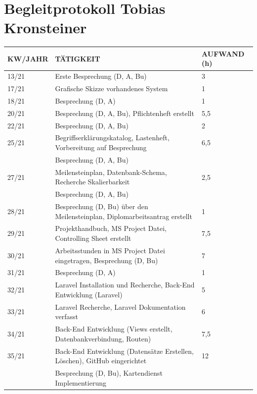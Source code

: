 







\newpage
\section{Begleitprotokoll Tobias Kronsteiner}
\begin{table}[h]
	\begin{tabular}{|l|l|l|}
		\hline
		\textbf{KW/JAHR} &     \textbf{TÄTIGKEIT}  & 	\textbf{AUFWAND (h)}    \\ \hline
		
		13/21   & Erste Besprechung (D, A, Bu) & 3 	\\ \hline
		17/21   & Grafische Skizze vorhandenes System  & 1 	\\ \hline
		18/21   & Besprechung (D, A)  & 1 	\\ \hline
		20/21   & Besprechung (D, A, Bu), Pflichtenheft erstellt & 5,5 	\\ \hline
		22/21   & Besprechung (D, A, Bu) & 2	\\ \hline
		25/21   & Begriffserklärungskatalog, Lastenheft, Vorbereitung auf Besprechung & 6,5   \\
		& Besprechung (D, A, Bu) & \\ \hline	
		27/21   & Meilensteinplan, Datenbank-Schema, Recherche Skalierbarkeit  & 2,5 \\
		& Besprechung (D, A, Bu) & 	\\ \hline		
		28/21   & Besprechung (D, Bu) über den Meilensteinplan, Diplomarbeitsantrag erstellt  & 1 \\ \hline		
		29/21   & Projekthandbuch, MS Project Datei, Controlling Sheet erstellt & 7,5	\\ \hline
		30/21   & Arbeitsstunden in MS Project Datei eingetragen, Besprechung (D, Bu) & 7 	\\ \hline
		31/21   & Besprechung (D, A)  & 1	\\ \hline
		32/21   & Laravel Installation und Recherche, Back-End Entwicklung (Laravel) & 5	\\ \hline
		33/21   & Laravel Recherche, Laravel Dokumentation verfasst & 6	\\ \hline
		34/21   & Back-End Entwicklung (Views erstellt, Datenbankverbindung, Routen) & 7,5	\\ \hline
		35/21   & Back-End Entwicklung (Datensätze Erstellen, Löschen), GitHub eingerichtet  & 12 \\ 
		& Besprechung (D, Bu), Kartendienst Implementierung  &	\\ \hline

\end{tabular}
\end{table}
